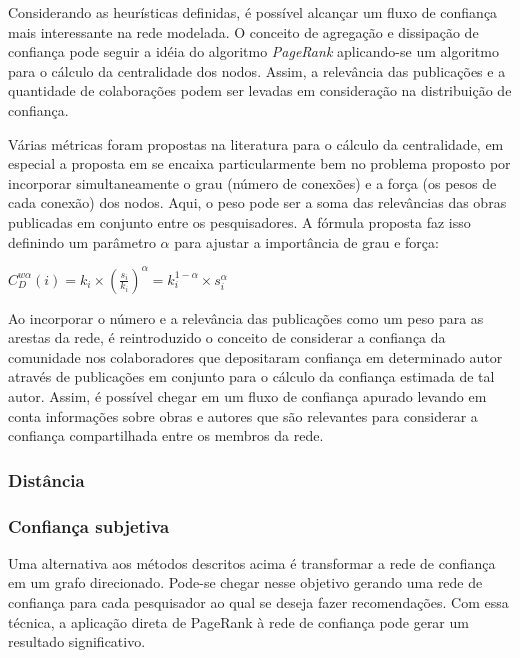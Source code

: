 \documentclass[12pt]{article}
\begin{document}
Considerando as heurísticas definidas, é possível alcançar um fluxo de confiança mais interessante na rede modelada. O conceito 
de agregação e dissipação de confiança pode seguir a idéia do algoritmo \textit{PageRank} aplicando-se um algoritmo para o 
cálculo da centralidade dos nodos. Assim, a relevância das publicações e a quantidade de colaborações podem ser levadas em 
consideração na distribuição de confiança.

Várias métricas foram propostas na literatura para o cálculo da centralidade, em especial a proposta em \cite{opsahl2010node} 
se encaixa particularmente bem no problema proposto por incorporar simultaneamente o grau (número de conexões) e a força 
(os pesos de cada conexão) dos nodos. Aqui, o peso pode ser a soma das relevâncias das obras publicadas em conjunto entre os 
pesquisadores. A fórmula proposta faz isso definindo um parâmetro $\alpha$ para ajustar a importância de grau e força:

\begin{center} 
  $ C_D ^{w \alpha} (i) = k_i \times \left( \frac {s_i} {k_i} \right) ^{\alpha} = k_i ^{1 - \alpha} \times s _i ^{\alpha} $
\end{center}

Ao incorporar o número e a relevância das publicações como um peso para as arestas da rede, é reintroduzido o conceito de 
considerar a confiança da comunidade nos colaboradores que depositaram confiança em determinado autor através de publicações 
em  conjunto para o cálculo da confiança estimada de tal autor. Assim, é possível chegar em um fluxo de confiança apurado 
levando em conta informações sobre obras e autores que são relevantes para considerar a confiança compartilhada entre 
os membros da rede.

\subsubsection{Distância}

\subsubsection{Confiança subjetiva}

Uma alternativa aos métodos descritos acima é transformar a rede de confiança em um grafo direcionado. Pode-se chegar nesse objetivo 
gerando uma rede de confiança para cada pesquisador ao qual se deseja fazer recomendações. Com essa técnica, a aplicação direta 
de PageRank à rede de confiança pode gerar um resultado significativo.
\end{document}
